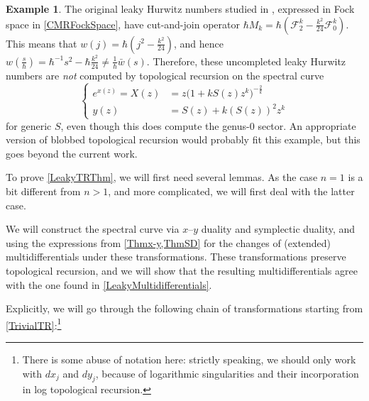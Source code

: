 \documentclass[10pt,a4paper,oneside,no-math,reqno]{amsart}%
\theoremstyle{plain}
\theoremstyle{definition}
\newtheorem{example}[theorem]{Example}
\theoremstyle{remark}
\numberwithin{equation}{section}
\newcommand{\mc}[1]{\mathcal{#1}}
\newcommand{\1}{\mathds{1}}
\newcommand{\<}{\langle}
\renewcommand{\>}{\rangle}
\begin{document}
\begin{example}
    The original leaky Hurwitz numbers studied in \cite{CMR25}, expressed in Fock space in \cref{CMRFockSpace}, have cut-and-join operator $ \hbar M_k = \hbar (\mc{F}_2^k - \frac{k^2}{24} \mc{F}^k_0)$. This means that $ w(j) = \hbar (j^2 - \frac{k^2}{24}) $, and hence $ w(\frac{s}{\hbar}) = \hbar^{-1} s^2 - \hbar \frac{k^2}{24} \neq \frac{1}{\hbar} \bar{w}(s)$. Therefore, these uncompleted leaky Hurwitz numbers are \emph{not} computed by topological recursion on the spectral curve
    \begin{equation}
		\begin{cases}
			e^{x(z)}
            =
            X(z)
			&=
			z \big( 1+ k S(z)z^k\big)^{-\frac{2}{k}}
			\\
			y (z)
			&=
			S(z) + k (S(z))^2 z^k
		\end{cases}
	\end{equation}
    for generic $ S$, even though this does compute the genus-$0$ sector. An appropriate version of blobbed topological recursion \cite{BS17,ABDKS25blobbed} would probably fit this example, but this goes beyond the current work.
\end{example}

To prove \cref{LeakyTRThm}, we will first need several lemmas. As the case $ n = 1$ is a bit different from $ n > 1$, and more complicated, we will first deal with the latter case.

We will construct the spectral curve via $x$--$y$ duality and symplectic duality, and using the expressions from \cref{Thmx-y,ThmSD} for the changes of (extended) multidifferentials under these transformations. These transformations preserve topological recursion, and we will show that the resulting multidifferentials agree with the one found in \cref{LeakyMultidifferentials}.

Explicitly, we will go through the following chain of transformations starting from \cref{TrivialTR}:\footnote{There is some abuse of notation here: strictly speaking, we should only work with $ dx_j$ and $ dy_j$, because of logarithmic singularities and their incorporation in log topological recursion.}
\end{document}
